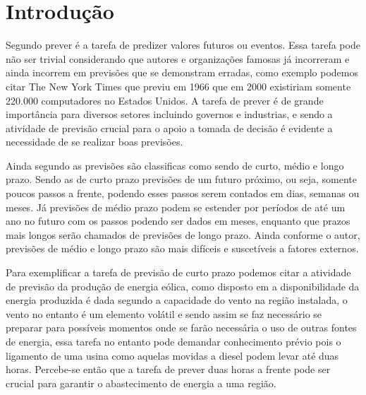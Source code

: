 \documentclass[
	12pt,
	oneside,
	a4paper,
	english,
	brazil
]{abntex2}
\begin{document}
\frenchspacing

\imprimircapa{}

\imprimirfolhaderosto{}

\textual{}

\tableofcontents*
\cleardoublepage{}

\chapter{Introdução}

Segundo  prever é a tarefa de predizer valores futuros ou 
eventos. Essa tarefa pode não ser trivial considerando que autores e 
organizações famosas já incorreram e ainda incorrem em previsões que se 
demonstram erradas, como exemplo podemos citar The New York Times que previu em 
1966 que em 2000 existiriam somente 220.000 computadores no Estados Unidos. A 
tarefa de prever é de grande importância para diversos setores incluindo 
governos e industrias, e sendo a atividade de previsão crucial para o apoio a 
tomada de decisão é evidente a necessidade de se realizar boas previsões.

Ainda segundo  as previsões são classificas como sendo de 
curto, médio e longo prazo.  Sendo as de curto prazo previsões de um futuro 
próximo, ou seja, somente poucos passos a frente, podendo esses passos serem 
contados em dias, semanas ou meses.  Já previsões de médio prazo podem se 
estender por períodos de até um ano no futuro com os passos podendo ser dados em 
meses, enquanto que prazos mais longos serão chamados de previsões de longo 
prazo. Ainda conforme o autor, previsões de médio e longo prazo são mais 
difíceis e suscetíveis a fatores externos.

Para exemplificar a tarefa de previsão de curto prazo podemos citar a atividade 
de previsão da produção de energia eólica, como disposto em 
 a disponibilidade da energia produzida é dada 
segundo a capacidade do vento na região instalada, o vento no entanto é um 
elemento volátil e sendo assim se faz necessário se preparar para possíveis 
momentos onde se farão necessária o uso de outras fontes de energia, essa tarefa 
no entanto pode demandar conhecimento prévio pois o ligamento de uma usina como 
aquelas movidas a diesel podem levar até duas horas. Percebe-se então que a 
tarefa de prever duas horas a frente pode ser crucial para garantir o 
abastecimento de energia a uma região.
\end{document}
